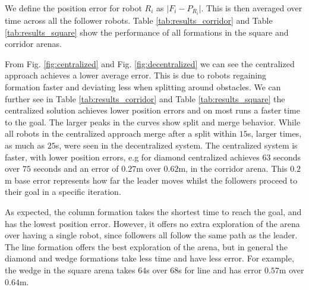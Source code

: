 \documentclass[letterpaper, 10 pt, conference]{ieeeconf}  %
\begin{document}
We define the position error for robot $R_i$ as $\lvert F_i - P_{R_i}\rvert$. This is then averaged over time across all the follower robots. Table \ref{tab:results_corridor} and Table \ref{tab:results_square} show the performance of all formations in the square and corridor arenas.

From Fig. \ref{fig:centralized} and Fig. \ref{fig:decentralized} we can see the centralized approach achieves a lower average error. This is due to robots regaining formation faster and deviating less when splitting around obstacles. We can further see in Table \ref{tab:results_corridor} and Table \ref{tab:results_square} the centralized solution achieves lower position errors and on most runs a faster time to the goal. The larger peaks in the curves show split and merge behavior. While all robots in the centralized approach merge after a split within $15$s, larger times, as much as $25$s, were seen in the decentralized system. The centralized system is faster, with lower position errors, e.g for diamond centralized achieves $63$ seconds over $75$ seconds and an error of $0.27$m over $0.62$m, in the corridor arena. This $0.2$m base error represents how far the leader moves whilst the followers proceed to their goal in a specific iteration.

As expected, the column formation takes the shortest time to reach the goal, and has the lowest position error. However, it offers no extra exploration of the arena over having a single robot, since followers all follow the same path as the leader. The line formation offers the best exploration of the arena, but in general the diamond and wedge formations take less time and have less error. For example, the wedge in the square arena takes $64$s over $68$s for line and has error $0.57$m over $0.64$m.
\end{document}

